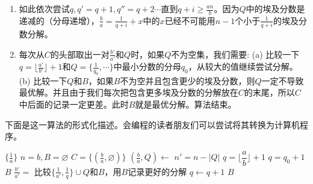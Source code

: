 \begin{enumerate}[1)]
  \item 如此依次尝试$q, q' = q + 1, q'' = q + 2 \cdots $直到$q + i \geq \frac{an}{b}$。因为$Q$中的埃及分数是递减的（分母递增），$\frac{b}{a} = \frac{1}{q+i} + x$中的$x$已经不可能用$n-1$个小于$\frac{1}{q+i}$的埃及分数分解。
  \item 每次从$C$的头部取出一对$\frac{b'}{a'}$和$Q$时，如果$Q$不为空集，我们需要: (a) 比较一下$q = \lfloor \frac{a'}{b'} \rfloor + 1$和$Q = \{\frac{1}{q_0}, \cdots \}$中最小分数的分母$q_0$，从较大的值继续尝试分解。(b) 比较一下$Q$和$B$，如果$B$不为空并且包含更少的埃及分数，则$Q$一定不导致最优解。并且由于我们每次把包含更多埃及分数的分解放在$C$的末尾，所以$C$中后面的记录一定更差。此时$B$就是最优分解。算法结束。
\end{enumerate}

下面是这一算法的形式化描述。会编程的读者朋友们可以尝试将其转换为计算机程序。

\begin{algorithmic}[1]
    \State \Return $\{\frac{1}{a}\}$
  \EndIf
  \State $n = b, B = \varnothing$
  \State $C = \{(\frac{b}{a}, \varnothing)\}$
    \State $(\frac{b}{a}, Q) \gets $   
    \State $n' = n - |Q|$                            
    \State $q = \lfloor \dfrac{a}{b} \rfloor + 1$
      
      \State $q = q_0 + 1$
    \EndIf
       
        \State \Return $B$
      \EndIf
      \State $\frac{b'}{a'} = $  
        \State 比较$\{\frac{1}{a'}, \frac{1}{q}\} \cup Q$和$B$，用$B$记录更好的分解
      \Else
        \State {} 
      \EndIf
      \State $q \gets q + 1$
    \EndWhile
  \EndWhile
  \State \Return $B$
\EndFunction
\end{algorithmic}
